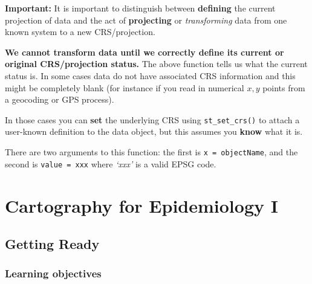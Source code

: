 \documentclass[
]{book}
\newenvironment{rmdnote}[1]
  {
  \begin{itemize}
  \renewcommand{\labelitemi}{
    \raisebox{-.7\height}[0pt][0pt]{
      {\setkeys{Gin}{width=3em,keepaspectratio}\texttt{[image: images/\#1]}}
    }
  }
  \setlength{\fboxsep}{1em}
  \begin{note}
  \item
  }
  {
  \end{note}
  \end{itemize}
  }
\begin{document}
\begin{rmdnote}{note}
\textbf{Important:} It is important to distinguish between \textbf{defining} the current projection of data and the act of \textbf{projecting} or \emph{transforming} data from one known system to a new CRS/projection.

\textbf{We cannot transform data until we correctly define its current or original CRS/projection status.} The above function tells us what the current status is. In some cases data do not have associated CRS information and this might be completely blank (for instance if you read in numerical \(x,y\) points from a geocoding or GPS process).

In those cases you can \textbf{set} the underlying CRS using \texttt{st\_set\_crs()} to attach a user-known definition to the data object, but this assumes you \textbf{know} what it is.

There are two arguments to this function: the first is \texttt{x\ =\ objectName}, and the second is \texttt{value\ =\ xxx} where \emph{`xxx'} is a valid EPSG code.

\end{rmdnote}

\hypertarget{cartography-for-epidemiology-i}{%
\chapter{Cartography for Epidemiology I}\label{cartography-for-epidemiology-i}}

\hypertarget{getting-ready-1}{%
\section{Getting Ready}\label{getting-ready-1}}

\hypertarget{learning-objectives-1}{%
\subsection{Learning objectives}\label{learning-objectives-1}}

 
  \providecommand{\huxb}[2]{\arrayrulecolor[RGB]{#1}\global\arrayrulewidth=#2pt}
  \providecommand{\huxvb}[2]{\color[RGB]{#1}\vrule width #2pt}
  \providecommand{\huxtpad}[1]{\rule{0pt}{#1}}
  \providecommand{\huxbpad}[1]{\rule[-#1]{0pt}{#1}}
\end{document}
